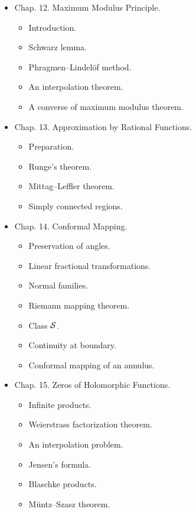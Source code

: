 \documentclass{article}
\begin{document}
\begin{itemize}
\begin{itemize}
\begin{itemize}
		\end{itemize}
		\item {\sf Chap. 12. Maximum Modulus Principle.}
		\begin{itemize}
			\item {\sf Introduction.}
			\item {\sf Schwarz lemma.}
			\item {\sf Phragmen--Lindel\"of method.}
			\item {\sf An interpolation theorem.}
			\item {\sf A converse of maximum modulus theorem.}
		\end{itemize}
		\item {\sf Chap. 13. Approximation by Rational Functions.}
		\begin{itemize}
			\item {\sf Preparation.}
			\item {\sf Runge's theorem.}
			\item {\sf Mittag--Leffler theorem.}
			\item {\sf Simply connected regions.}
		\end{itemize}
		\item {\sf Chap. 14. Conformal Mapping.}
		\begin{itemize}
			\item {\sf Preservation of angles.}
			\item {\sf Linear fractional transformations.}
			\item {\sf Normal families.}
			\item {\sf Riemann mapping theorem.}
			\item {\sf Class ${\cal S}$.}
			\item {\sf Continuity at boundary.}
			\item {\sf Conformal mapping of an annulus.}
		\end{itemize}
		\item {\sf Chap. 15. Zeros of Holomorphic Functions.}
		\begin{itemize}
			\item {\sf Infinite products.}
			\item {\sf Weierstrass factorization theorem.}
			\item {\sf An interpolation problem.}
			\item {\sf Jensen's formula.}
			\item {\sf Blaschke products.}
			\item {\sf M\"untz--Szasz theorem.}
		\end{itemize}

\end{itemize}
\end{itemize}
\end{document}
